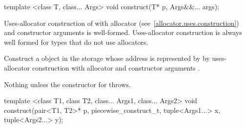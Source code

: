 %
%
\begin{itemdecl}
template <class T, class... Args>
  void construct(T* p, Args&&... args);
\end{itemdecl}

\begin{itemdescr}
\pnum
\requires
Uses-allocator construction of 
with allocator  (see~\ref{allocator.uses.construction})
and constructor arguments  is well-formed.
\enternote
Uses-allocator construction is always well formed
for types that do not use allocators.\exitnote

\pnum
\effects
Construct a  object in the storage
whose address is represented by 
by uses-allocator construction with allocator 
and constructor arguments .

\pnum
\throws
Nothing unless the constructor for  throws.
\end{itemdescr}

%
%
\begin{itemdecl}
template <class T1, class T2, class... Args1, class... Args2>
  void construct(pair<T1, T2>* p, piecewise_construct_t,
                 tuple<Args1...> x, tuple<Args2...> y);
\end{itemdecl}

